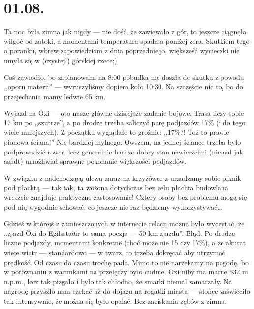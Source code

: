 \chapter*{01.08.}

Ta noc była zimna jak nigdy --- nie dość, że zawiewało z gór, to jeszcze ciągnęła wilgoć od zatoki, a momentami temperatura spadała poniżej zera. Skutkiem tego o poranku, wbrew zapowiedziom z dnia poprzedniego, większość wycieczki nie umyła się w (czystej!) górskiej rzece;)


Coś zawiodło, bo zaplanowana na 8:00 pobudka nie doszła do skutku z powodu ,,oporu materii'' --- wyruszyliśmy dopiero koło 10:30. Na szczęście nic to, bo do przejechania mamy ledwie 65 km.

Wyjazd na Öxi --- oto nasze główne dzisiejsze zadanie bojowe. Trasa liczy sobie 17 km po ,,szutrze'', a po drodze trzeba zaliczyć parę podjazdów 17\% (i do tego wiele mniejszych). Z początku wyglądało to groźnie: ,,17\%?! Toż to prawie pionowa ściana!'' Nic bardziej mylnego. Owszem, na jednej ściance trzeba było podprowadzić rower, lecz generalnie bardzo dobry stan nawierzchni (niemal jak asfalt) umożliwiał sprawne pokonanie większości podjazdów.


W związku z nadchodzącą ulewą zaraz na krzyżówce z  urządzamy sobie piknik pod płachtą --- tak tak, ta wożona dotychczas bez celu płachta budowlana wreszcie znajduje praktyczne zastosowanie! Cztery osoby bez problemu mogą się pod nią wygodnie schować, co jeszcze nie raz będziemy wykorzystywać…

Gdzieś w którejś z zamieszczonych w internecie relacji można było wyczytać, że ,,zjazd Öxi do Egilsstaðir to sama poezja --- 50 km zjazdu''. Błąd. Po drodze liczne podjazdy, momentami konkretne (choć może nie 15 czy 17\%), a że akurat wieje wiatr --- standardowo --- w twarz, to trzeba dokręcać aby utrzymać prędkość. Od czasu do czasu trochę pada. Mimo to nie narzekamy na pogodę, bo w porównaniu z warunkami na przełęczy było cudnie. Öxi niby ma marne 532 m n.p.m., lecz tak pizgało i było tak chłodno, że smarki niemal zamarzały. Na nagrodę przyszło nam czekać aż do dojazu na rogatki miasta --- słońce zaświeciło tak intensywnie, że można się było opalać. Bez zaciskania zębów z zimna.

